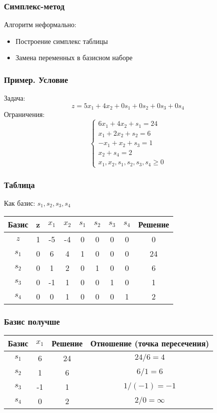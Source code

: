 \documentclass[12pt]{beamer}
\begin{document}
\begin{frame}
	\frametitle{Симплекс-метод}
Алгоритм неформально: 
\begin{itemize}
	\item Построение симплекс таблицы
	\item Замена переменных в базисном наборе
\end{itemize}
\end{frame}
\begin{frame}
	\frametitle{Пример. Условие}
Задача:
\[z=5x_1+4x_2+0s_1+0s_2+0s_3+0s_4\]
Ограничения: 
\begin{equation}
	\begin{cases}	
		6x_1+4x_2+s_1= 24\\
		x_1+2x_2+s_2= 6\\
		-x_1+x_2+s_3=1\\
		x_2+s_4=2\\
		x_1,x_2,s_1,s_2,s_3,s_4\geq0
	\end{cases}
\end{equation}
\end{frame}
\begin{frame}
	\frametitle{Таблица}
	Как базис: $s_1,s_2,s_3,s_4$
	
	\begin{tabular}{|c|c|c|c|c|c|c|c|c|}
		\hline
		Базис & z  & $x_1$ & $x_2$  & $s_1$  & $s_2$  & $s_3$  & $s_4$  & Решение \\
		\hline
		$z $& 1  &  -5 & -4 & 0 & 0  & 0  & 0 & 0 \\
		\hline
		$s_1$& 0 & 6 & 4  & 1  & 0 & 0 & 0 & 24 \\
		
		$s_2$& 0 & 1 & 2 & 0 & 1 & 0 & 0 & 6 \\
		
		$s_3$& 0 & -1 & 1 & 0 & 0 & 1 & 0 & 1 \\
		
		$s_4$& 0 & 0 & 1 & 0 & 0 & 0 & 1 & 2 \\ 
		\hline
	\end{tabular}
\end{frame}
\begin{frame}
	\frametitle{Базис получше}
	\begin{tabular}{|c|c|c|c|}
		\hline
		Базис & $x_1$  & Решение & Отношение (точка пересечения)  \\
		\hline
		
		$s_1$& 6 & 24 & $24/6=4$  \\
		
		$s_2$& 1 & 6 & $6/1=6$ \\
		
		$s_3$& -1 & 1 & $1/(-1)=-1$ \\
		
		$s_4$& 0 & 2 & $2/0=\infty$ \\ 
		\hline
	\end{tabular}
\end{frame}
\end{document}
